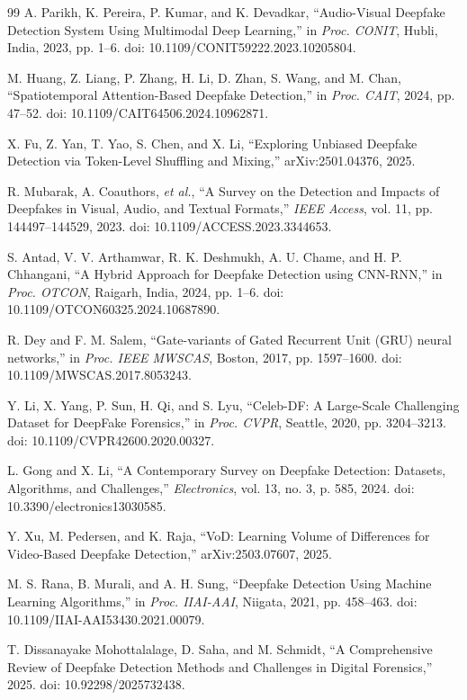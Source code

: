 \begin{thebibliography}{99}
A. Parikh, K. Pereira, P. Kumar, and K. Devadkar, ``Audio-Visual Deepfake Detection System Using Multimodal Deep Learning,'' in \textit{Proc. CONIT}, Hubli, India, 2023, pp. 1--6. doi: 10.1109/CONIT59222.2023.10205804.

M. Huang, Z. Liang, P. Zhang, H. Li, D. Zhan, S. Wang, and M. Chan, ``Spatiotemporal Attention-Based Deepfake Detection,'' in \textit{Proc. CAIT}, 2024, pp. 47--52. doi: 10.1109/CAIT64506.2024.10962871.

X. Fu, Z. Yan, T. Yao, S. Chen, and X. Li, ``Exploring Unbiased Deepfake Detection via Token-Level Shuffling and Mixing,'' arXiv:2501.04376, 2025.

R. Mubarak, A. Coauthors, \textit{et al.}, ``A Survey on the Detection and Impacts of Deepfakes in Visual, Audio, and Textual Formats,'' \textit{IEEE Access}, vol. 11, pp. 144497--144529, 2023. doi: 10.1109/ACCESS.2023.3344653.

S. Antad, V. V. Arthamwar, R. K. Deshmukh, A. U. Chame, and H. P. Chhangani, ``A Hybrid Approach for Deepfake Detection using CNN-RNN,'' in \textit{Proc. OTCON}, Raigarh, India, 2024, pp. 1--6. doi: 10.1109/OTCON60325.2024.10687890.

R. Dey and F. M. Salem, ``Gate-variants of Gated Recurrent Unit (GRU) neural networks,'' in \textit{Proc. IEEE MWSCAS}, Boston, 2017, pp. 1597--1600. doi: 10.1109/MWSCAS.2017.8053243.

Y. Li, X. Yang, P. Sun, H. Qi, and S. Lyu, ``Celeb-DF: A Large-Scale Challenging Dataset for DeepFake Forensics,'' in \textit{Proc. CVPR}, Seattle, 2020, pp. 3204--3213. doi: 10.1109/CVPR42600.2020.00327.

L. Gong and X. Li, ``A Contemporary Survey on Deepfake Detection: Datasets, Algorithms, and Challenges,'' \textit{Electronics}, vol. 13, no. 3, p. 585, 2024. doi: 10.3390/electronics13030585.

Y. Xu, M. Pedersen, and K. Raja, ``VoD: Learning Volume of Differences for Video-Based Deepfake Detection,'' arXiv:2503.07607, 2025.

M. S. Rana, B. Murali, and A. H. Sung, ``Deepfake Detection Using Machine Learning Algorithms,'' in \textit{Proc. IIAI-AAI}, Niigata, 2021, pp. 458--463. doi: 10.1109/IIAI-AAI53430.2021.00079.

T. Dissanayake Mohottalalage, D. Saha, and M. Schmidt, ``A Comprehensive Review of Deepfake Detection Methods and Challenges in Digital Forensics,'' 2025. doi: 10.92298/2025732438.


\end{thebibliography}

